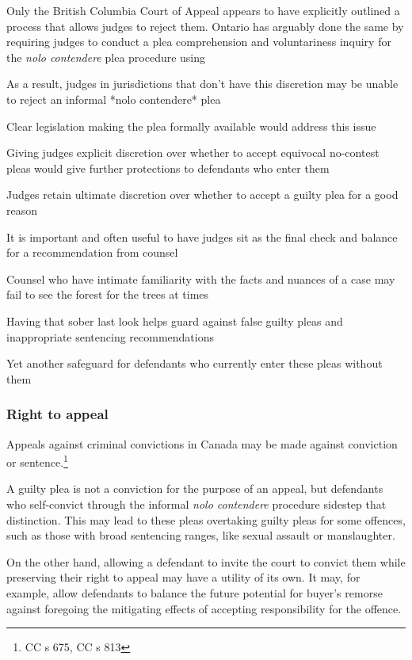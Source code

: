 Only the British Columbia Court of Appeal appears to have explicitly outlined a process that allows judges to reject them. Ontario has arguably done the same by requiring judges to conduct a plea comprehension and voluntariness inquiry for the \textit{nolo contendere} plea procedure using 

As a result, judges in jurisdictions that don't have this discretion may be unable to reject an informal *nolo contendere* plea

Clear legislation making the plea formally available would address this issue

Giving judges explicit discretion over whether to accept equivocal no-contest pleas would give further protections to defendants who enter them

Judges retain ultimate discretion over whether to accept a guilty plea for a good reason

It is important and often useful to have judges sit as the final check and balance for a recommendation from counsel

Counsel who have intimate familiarity with the facts and nuances of a case may fail to see the forest for the trees at times

Having that sober last look helps guard against false guilty pleas and inappropriate sentencing recommendations

Yet another safeguard for defendants who currently enter these pleas without them

\subsubsection{Right to appeal}

Appeals against criminal convictions in Canada may be made against conviction or sentence.\footnote{CC s 675, CC s 813}

A guilty plea is not a conviction for the purpose of an appeal, but defendants who self-convict through the informal \textit{nolo contendere} procedure sidestep that distinction. This may lead to these pleas overtaking guilty pleas for some offences, such as those with broad sentencing ranges, like sexual assault or manslaughter. 

On the other hand, allowing a defendant to invite the court to convict them while preserving their right to appeal may have a utility of its own. It may, for example, allow defendants to balance the future potential for buyer's remorse against foregoing the mitigating effects of accepting responsibility for the offence. 

